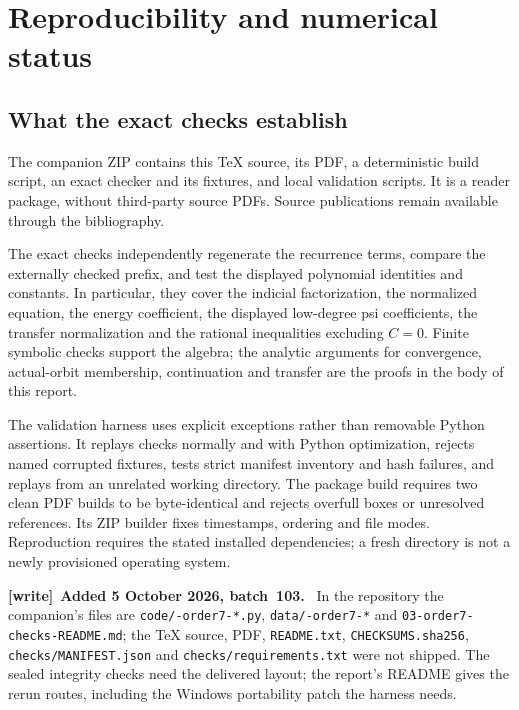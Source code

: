 \documentclass[11pt]{article}
\theoremstyle{remark}\newtheorem{remark}[theorem]{Remark}
\numberwithin{equation}{section}
\newenvironment{writenote}[1][]{\par\smallskip\begingroup\small
 \noindent\textbf{[write]}\if\relax\detokenize{#1}\relax\else~\textbf{#1.}\fi\ }%
 {\par\endgroup\smallskip}
\begin{document}
\section{Reproducibility and numerical status}\label{his:o7:computations}
\subsection{What the exact checks establish}
The companion ZIP contains this TeX source, its PDF, a deterministic
build script, an exact checker and its fixtures, and local validation
scripts. It is a reader package, without third-party source PDFs.
Source publications remain available
through the bibliography.

The exact checks independently regenerate the recurrence terms,
compare the externally checked prefix, and test the displayed
polynomial identities and constants. In particular, they cover
the indicial factorization, the normalized equation, the energy
coefficient, the displayed low-degree psi coefficients, the transfer
normalization and the rational inequalities excluding $C=0$.
Finite symbolic checks support the algebra; the analytic arguments
for convergence, actual-orbit membership, continuation and transfer
are the proofs in the body of this report.

The validation harness uses explicit exceptions rather than
removable Python assertions. It replays checks normally and with
Python optimization, rejects named corrupted fixtures, tests strict
manifest inventory and hash failures, and replays from an unrelated
working directory. The package build requires two clean PDF builds
to be byte-identical and rejects overfull boxes or unresolved
references. Its ZIP builder fixes timestamps, ordering and file
modes. Reproduction requires the stated installed dependencies;
a fresh directory is not a newly provisioned operating system.
\begin{writenote}[Added 5 October 2026, batch~103]
\sloppy{}\relax In the repository the companion's files are \texttt{code/-order7-*.py}, \texttt{data/-order7-*} and \texttt{03-order7-\allowbreak checks-README.md}; the TeX source, PDF, \texttt{README.txt}, \texttt{CHECKSUMS.sha256}, \texttt{checks/\allowbreak MANIFEST.json} and \texttt{checks/\allowbreak requirements.txt} were not shipped. The sealed integrity checks need the delivered layout; the report's README gives the rerun routes, including the Windows portability patch the harness needs.
\end{writenote}
\end{document}
